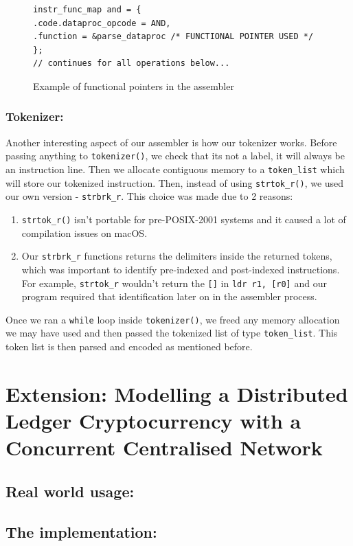 \documentclass[a4paper]{article}
\begin{document}
\begin{figure}[htp]
\centering
\begin{BVerbatim}
instr_func_map and = {
.code.dataproc_opcode = AND,
.function = &parse_dataproc /* FUNCTIONAL POINTER USED */
};
// continues for all operations below...
\end{BVerbatim}
\caption{Example of functional pointers in the assembler}
\label{fig:functional_pointers}
\end{figure}

\subsubsection{Tokenizer:}
Another interesting aspect of our assembler is how our tokenizer works. Before passing anything to \verb|tokenizer()|, we check that its not a label, it will always be an instruction line. Then we allocate contiguous memory to a \verb|token_list| which will store our tokenized instruction. Then, instead of using \verb|strtok_r()|, we used our own version - \verb|strbrk_r|. This choice was made due to 2 reasons:
\begin{enumerate}
    \item \verb|strtok_r()| isn't portable for pre-POSIX-2001 systems and it caused a lot of compilation issues on macOS.
    \item Our \verb|strbrk_r| functions returns the delimiters inside the returned tokens, which was important to identify pre-indexed and post-indexed instructions. For example, \verb|strtok_r| wouldn't return the \verb|[]| in \verb|ldr r1, [r0]| and our program required that identification later on in the assembler process.
\end{enumerate}
Once we ran a \verb|while| loop inside \verb|tokenizer()|, we freed any memory allocation we may have used and then passed the tokenized list of type \verb|token_list|. This token list is then parsed and encoded as mentioned before.

\section{Extension: Modelling a Distributed Ledger Cryptocurrency with a Concurrent Centralised Network}
\subsection{Real world usage:}
\lipsum[1-1]
\subsection{The implementation:}
\lipsum[1-1]
\end{document}
